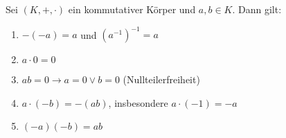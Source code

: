 Sei $(K, +, \cdot)$ ein kommutativer Körper und $a, b \in K$. Dann gilt:
\begin{enumerate}
    \item $-(-a) = a$ und $(a^{-1})^{-1} = a$
    \item $a \cdot 0 = 0$
    \item $ab = 0 \rightarrow a = 0 \lor b = 0$ (Nullteilerfreiheit)
    \item $a \cdot (-b) = -(ab)$, insbesondere $a \cdot (-1) = -a$
    \item $(-a)(-b) = ab$
\end{enumerate}